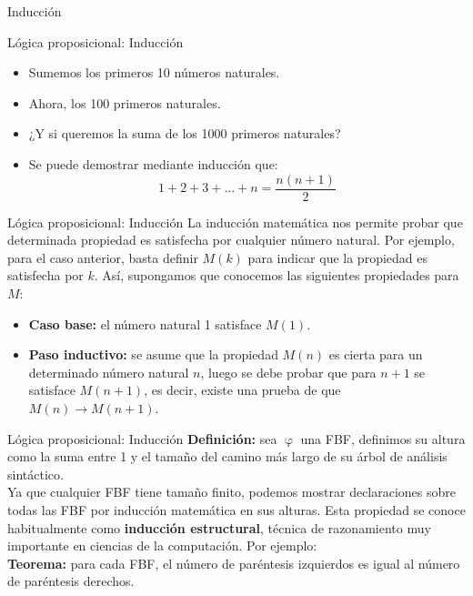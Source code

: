 \documentclass{beamer}
\begin{document}
\begin{frame}[plain,c]
  \vspace{1cm}
  \begin{center}
    \Huge Inducción
  \end{center}
\end{frame}


\begin{frame}{Lógica proposicional: Inducción}
  \begin{itemize}[<+->]
    \item Sumemos los primeros 10 números naturales.
    \item Ahora, los 100 primeros naturales.
    \item ¿Y si queremos la suma de los 1000 primeros naturales?
    \item Se puede demostrar mediante inducción que:
    $$1 + 2 + 3 + ... + n = \dfrac{n (n+1)}{2}$$
  \end{itemize}
\end{frame}


\begin{frame}{Lógica proposicional: Inducción}
  La inducción matemática nos permite probar que determinada propiedad es
  satisfecha por cualquier número natural. Por ejemplo, para el caso anterior,
  basta definir $M(k)$ para indicar que la propiedad es satisfecha por $k$. Así,
  supongamos que conocemos las siguientes propiedades para $M$:\\

  \begin{itemize}
    \item \textbf{Caso base:} el número natural 1 satisface $M(1)$.
    \item \textbf{Paso inductivo:} se asume que la propiedad $M(n)$ es cierta
          para un determinado número natural $n$, luego se debe probar que para
          $n+1$ se satisface $M(n+1)$, es decir, existe una prueba de que $M(n) \rightarrow M(n+1)$.
  \end{itemize}
\end{frame}


\begin{frame}{Lógica proposicional: Inducción}
  \textbf{Definición:} sea $\upvarphi$ una FBF, definimos su altura como la suma
  entre 1 y el tamaño del camino más largo de su árbol de análisis sintáctico.\\

  Ya que cualquier FBF tiene tamaño finito, podemos mostrar declaraciones sobre
  todas las FBF por inducción matemática en sus alturas. Esta propiedad se
  conoce habitualmente como \textbf{inducción estructural}, técnica de
  razonamiento muy importante en ciencias de la computación. Por ejemplo:\\

  \textbf{Teorema:} para cada FBF, el número de paréntesis izquierdos es igual al número de paréntesis derechos.
\end{frame}
\end{document}

